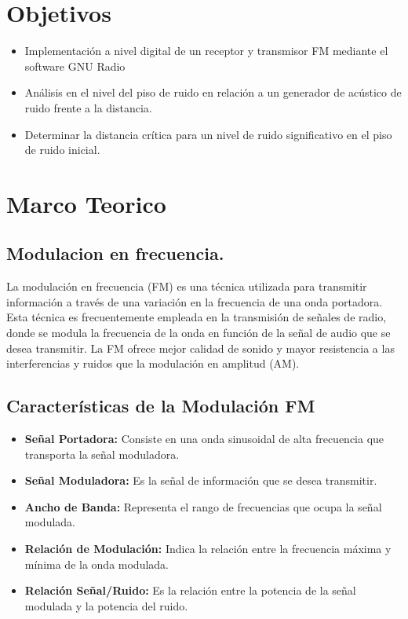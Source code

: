 \documentclass[conference]{IEEEtran}
\begin{document}
	\section{ Objetivos }
	
	\begin{itemize}
		\item Implementación a nivel digital de un receptor y transmisor FM mediante el software GNU Radio
		\item Análisis en el nivel del piso de ruido en relación a un generador de acústico de ruido frente a la distancia.
		\item Determinar la distancia crítica para un nivel de ruido significativo en el piso de ruido inicial.
	\end{itemize}
	
	\section{Marco Teorico}
	
	\subsection{Modulacion en frecuencia.}
	La modulación en frecuencia (FM) es una técnica utilizada para transmitir información a través de una variación en la frecuencia de una onda portadora. Esta técnica es frecuentemente empleada en la transmisión de señales de radio, donde se modula la frecuencia de la onda en función de la señal de audio que se desea transmitir. La FM ofrece mejor calidad de sonido y mayor resistencia a las interferencias y ruidos que la modulación en amplitud (AM).
	
	\subsection*{Características de la Modulación FM}
	\begin{itemize}
		\item \textbf{Señal Portadora:} Consiste en una onda sinusoidal de alta frecuencia que transporta la señal moduladora.
		\item \textbf{Señal Moduladora:} Es la señal de información que se desea transmitir.
		\item \textbf{Ancho de Banda:} Representa el rango de frecuencias que ocupa la señal modulada.
		\item \textbf{Relación de Modulación:} Indica la relación entre la frecuencia máxima y mínima de la onda modulada.
		\item \textbf{Relación Señal/Ruido:} Es la relación entre la potencia de la señal modulada y la potencia del ruido.
	\end{itemize}
	
\end{document}
